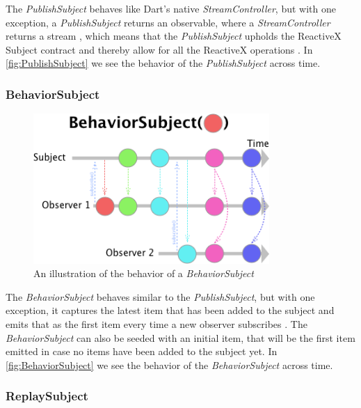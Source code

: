 The \textit{PublishSubject} behaves like Dart's native \textit{StreamController}, but with one exception, a \textit{PublishSubject} returns an observable, where a \textit{StreamController} returns a stream \cite{PublishSubject}, which means that the \textit{PublishSubject} upholds the ReactiveX Subject contract and thereby allow for all the ReactiveX operations \cite{PublishSubject}. In \autoref{fig:PublishSubject} we see the behavior of the \textit{PublishSubject} across  time.

\subsubsection{BehaviorSubject}
\begin{figure}[h]
    \centering
    \includegraphics[width=0.8\textwidth]{figures/BehaviorSubject.png}
    \caption{An illustration of the behavior of a \textit{BehaviorSubject}}
    \label{fig:BehaviorSubject}
\end{figure}

The \textit{BehaviorSubject} behaves similar to the \textit{PublishSubject}, but with one exception, it captures the latest item that has been added to the subject and emits that as the first item every time a new observer subscribes \cite{BehaviorSubject}. The \textit{BehaviorSubject} can also be seeded with an initial item, that will be the first item emitted in case no items have been added to the subject yet. In \autoref{fig:BehaviorSubject} we see the behavior of the \textit{BehaviorSubject} across  time.

\subsubsection{ReplaySubject}


